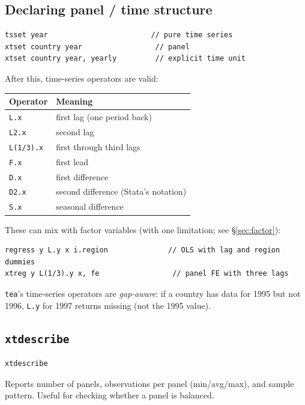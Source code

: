 \documentclass[11pt,letterpaper]{article}
\begin{document}
\subsection{Declaring panel / time structure}

\begin{lstlisting}
tsset year                        // pure time series
xtset country year                 // panel
xtset country year, yearly         // explicit time unit
\end{lstlisting}

After this, time-series operators are valid:

\begin{center}
\begin{tabular}{ll}
\toprule
Operator & Meaning \\
\midrule
\texttt{L.x} & first lag (one period back) \\
\texttt{L2.x} & second lag \\
\texttt{L(1/3).x} & first through third lags \\
\texttt{F.x} & first lead \\
\texttt{D.x} & first difference \\
\texttt{D2.x} & second difference (Stata's notation) \\
\texttt{S.x} & seasonal difference \\
\bottomrule
\end{tabular}
\end{center}

These can mix with factor variables (with one limitation; see
\S\ref{sec:factor}):

\begin{lstlisting}
regress y L.y x i.region              // OLS with lag and region dummies
xtreg y L(1/3).y x, fe                 // panel FE with three lags
\end{lstlisting}

\texttt{tea}'s time-series operators are \emph{gap-aware}: if a country
has data for 1995 but not 1996, \texttt{L.y} for 1997 returns missing
(not the 1995 value).

\subsection{\texttt{xtdescribe}}

\begin{lstlisting}
xtdescribe
\end{lstlisting}

Reports number of panels, observations per panel (min/avg/max), and
sample pattern.  Useful for checking whether a panel is balanced.
\end{document}
